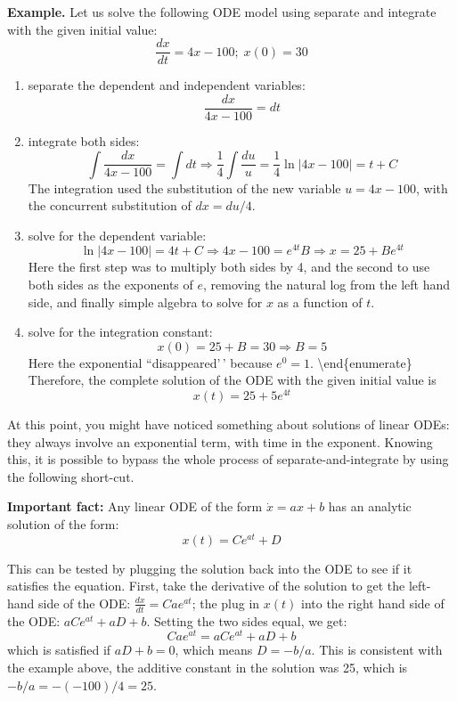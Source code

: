 \documentclass[
  letterpaper,
  DIV=11,
  numbers=noendperiod]{scrreprt}
\begin{document}
\textbf{Example.} Let us solve the following ODE model using separate
and integrate with the given initial value:
\[\frac{dx}{dt} = 4x -100;  \; x(0) = 30\]

\begin{enumerate}
\def\labelenumi{\arabic{enumi}.}
\item
  separate the dependent and independent variables:
  \[ \frac{dx}{4x - 100} = dt\]
\item
  integrate both sides:
  \[  \int \frac{dx}{4x -100} =  \int dt \Rightarrow \frac{1}{4} \int \frac{du}{u} = \frac{1}{4} \ln | 4x- 100 |  = t + C\]
  The integration used the substitution of the new variable
  \(u=4x -100\), with the concurrent substitution of \(dx = du/4\).
\item
  solve for the dependent variable:
  \[  \ln | 4x- 100 |  = 4t + C \Rightarrow 4x-100 = e^{4t} B  \Rightarrow x = 25  + Be^{4t}\]
  Here the first step was to multiply both sides by 4, and the second to
  use both sides as the exponents of \(e\), removing the natural log
  from the left hand side, and finally simple algebra to solve for \(x\)
  as a function of \(t\).
\item
  solve for the integration constant:
  \[ x(0) = 25  + B = 30 \Rightarrow B = 5\] Here the exponential
  ``disappeared'\,' because \(e^0=1\). \textbackslash end\{enumerate\}
  Therefore, the complete solution of the ODE with the given initial
  value is \[x(t) =  25  + 5e^{4t}\]
\end{enumerate}

At this point, you might have noticed something about solutions of
linear ODEs: they always involve an exponential term, with time in the
exponent. Knowing this, it is possible to bypass the whole process of
separate-and-integrate by using the following short-cut.

\textbf{Important fact:} Any linear ODE of the form \(\dot x= ax +b\)
has an analytic solution of the form: \[ x(t) = Ce^{at} + D\]

This can be tested by plugging the solution back into the ODE to see if
it satisfies the equation. First, take the derivative of the solution to
get the left-hand side of the ODE: \(\frac{dx}{dt} = Ca e^{at}\); the
plug in \(x(t)\) into the right hand side of the ODE:
\(aCe^{at} + aD +b\). Setting the two sides equal, we get:
\[Ca e^{at} = aCe^{at} + aD +b\] which is satisfied if \(aD + b = 0\),
which means \(D= -b/a\). This is consistent with the example above, the
additive constant in the solution was 25, which is
\(-b/a= -(-100)/4 = 25\).
\end{document}
